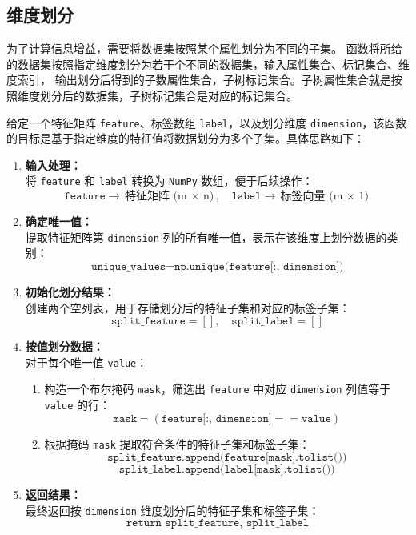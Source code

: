 \documentclass[12pt,a4paper,oneside]{article}
\begin{document}
\subsection{维度划分}
\qquad 为了计算信息增益，需要将数据集按照某个属性划分为不同的子集。
函数将所给的数据集按照指定维度划分为若干个不同的数据集，输入属性集合、标记集合、维度索引，
输出划分后得到的子数属性集合，子树标记集合。子树属性集合就是按照维度划分后的数据集，子树标记集合是对应的标记集合。

给定一个特征矩阵 \texttt{feature}、标签数组 \texttt{label}，以及划分维度 \texttt{dimension}，该函数的目标是基于指定维度的特征值将数据划分为多个子集。具体思路如下：

\begin{enumerate}
    \item \textbf{输入处理：} \\
    将 \texttt{feature} 和 \texttt{label} 转换为 \texttt{NumPy} 数组，便于后续操作：
    \[
    \texttt{feature} \rightarrow \text{特征矩阵 (m $\times$ n)}, \quad
    \texttt{label} \rightarrow \text{标签向量 (m $\times$ 1)}
    \]

    \item \textbf{确定唯一值：} \\
    提取特征矩阵第 \texttt{dimension} 列的所有唯一值，表示在该维度上划分数据的类别：
    \[
    \texttt{unique\_values} = \texttt{np.unique(feature[:, dimension])}
    \]

    \item \textbf{初始化划分结果：} \\
    创建两个空列表，用于存储划分后的特征子集和对应的标签子集：
    \[
    \texttt{split\_feature} = [], \quad \texttt{split\_label} = []
    \]

    \item \textbf{按值划分数据：} \\
    对于每个唯一值 \texttt{value}：
    \begin{enumerate}
        \item 构造一个布尔掩码 \texttt{mask}，筛选出 \texttt{feature} 中对应 \texttt{dimension} 列值等于 \texttt{value} 的行：
        \[
        \texttt{mask} = (\texttt{feature[:, dimension]} == \texttt{value})
        \]
        
        \item 根据掩码 \texttt{mask} 提取符合条件的特征子集和标签子集：
        \[
        \texttt{split\_feature.append(feature[mask].tolist())}
        \]
        \[
        \texttt{split\_label.append(label[mask].tolist())}
        \]
    \end{enumerate}

    \item \textbf{返回结果：} \\
    最终返回按 \texttt{dimension} 维度划分后的特征子集和标签子集：
    \[
    \texttt{return split\_feature, split\_label}
    \]
\end{enumerate}
\end{document}
